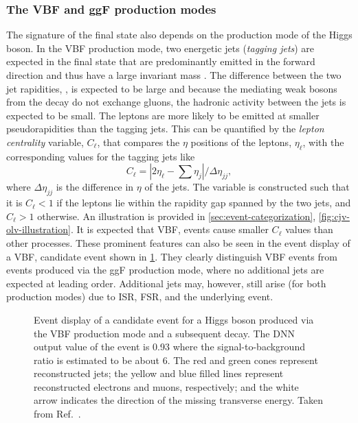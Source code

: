\subsubsection{The VBF and ggF production modes}
The signature of the final state also depends on the production mode of the Higgs boson.
In the VBF production mode, two energetic jets (\emph{tagging jets}) are expected in the final state that are predominantly emitted in the forward direction and thus have a large invariant mass \mjj. 
The difference between the two jet rapidities, \dyjj, is expected to be large and because the mediating weak bosons from the \HWW decay do not exchange gluons, the hadronic activity between the jets is expected to be small. 
The leptons are more likely to be emitted at smaller pseudorapidities than the tagging jets. This can be quantified by the \emph{lepton centrality} variable, $C_\ell$, that compares the $\eta$ positions of the leptons, $\eta_\ell$, with the corresponding values for the tagging jets like
\begin{equation}
    \label{eq:lep-centr}
    C_\ell = |2\eta_\ell - \sum \eta_j| / \Delta \eta_{jj},
\end{equation}
where $\Delta \eta_{jj}$ is the difference in $\eta$ of the jets. 
The variable is constructed such that it is $C_\ell < 1$ if the leptons lie within the rapidity gap spanned by the two jets, and $C_\ell > 1$ otherwise. An illustration is provided in \cref{sec:event-categorization}, \cref{fig:cjv-olv-illustration}. 
It is expected that VBF, \HWW events cause smaller $C_\ell$ values than other processes.
These prominent features can also be seen in the event display of a VBF, \HWW candidate event shown in \cref{fig:vbf-event-display}. 
They clearly distinguish VBF events from events produced via the ggF production mode, where no additional jets are expected at leading order. 
Additional jets may, however, still arise (for both production modes) due to ISR, FSR, and the underlying event. 

\begin{figure}
    {}
    {}
    \caption[Event display of a candidate event for a Higgs boson produced via the VBF production mode and a subsequent \HWWdet decay.]{Event display of a candidate event for a Higgs boson produced via the VBF production mode and a subsequent \HWWdet decay. The DNN output value of the event is 0.93 where the signal-to-background ratio is estimated to be about 6. 
    The red and green cones represent reconstructed jets; the yellow and blue filled lines represent reconstructed electrons and muons, respectively; and the white arrow indicates the direction of the missing transverse energy. 
    Taken from Ref.~\cite{HWWPaper}.}
    \label{fig:vbf-event-display}
\end{figure}

